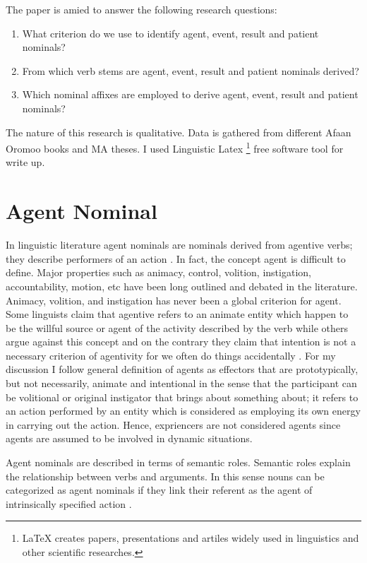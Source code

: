 \documentclass[11pt,a4paper]{article}
\begin{document}
The paper is amied to answer the following research questions:\\
\begin{enumerate}
	\item What criterion do we use to identify agent, event, result and patient nominals? 
	\item From which verb stems are agent, event, result and patient nominals derived?
	\item Which nominal affixes are employed to derive agent, event, result and patient nominals?
\end{enumerate}

The nature of this research is qualitative. Data is gathered from different Afaan Oromoo books and MA theses. I used Linguistic Latex \footnote{LaTeX creates papers, presentations and artiles widely used in linguistics and other scientific researches.} free software tool for write up. 

\section{Agent Nominal}

In linguistic literature agent nominals are nominals derived from agentive verbs; they describe performers of an action \cite{huyghe2020s}. In fact, the concept agent is difficult to define. Major properties  such as animacy, control, volition, instigation, accountability, motion, etc have been long outlined and debated in the literature. Animacy, volition, and instigation has never been a global criterion for agent. Some linguists claim that agentive refers to an animate entity which happen to be the willful source or agent of the activity described by the verb \cite{cruse1973some} while others argue against this concept and on the contrary they claim that intention is not a necessary criterion of agentivity for we often do things accidentally \cite{schlesinger1989instruments,caspar2015relationship}. For my discussion I follow \cite[p-188]{huyghe2020s} general definition of agents as effectors that are prototypically, but not necessarily, animate and intentional in the sense that the participant can be volitional or original instigator that brings about something about; it refers to an action performed by an entity which is considered as employing its own energy in carrying out the action. Hence, expriencers are not considered  agents since agents are assumed to be involved in dynamic situations. 


Agent nominals are described in terms of  semantic roles. Semantic roles explain the relationship between verbs and arguments. In this sense nouns can be categorized as agent nominals if they link their referent as the agent of intrinsically specified action \cite[p-189]{huyghe2020s}. 
\end{document}
